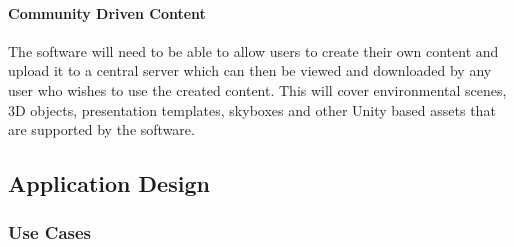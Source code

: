 \documentclass{article}
\begin{document}
		\paragraph{Community Driven Content}

		The software will need to be able to allow users to create their own content and upload it to a central server which can then be viewed and downloaded by any user who wishes to use the created content.
		This will cover environmental scenes, 3D objects, presentation templates, skyboxes and other Unity based assets that are supported by the software.

\subsection{Application Design}
	\subsubsection{Use Cases}
\end{document}
